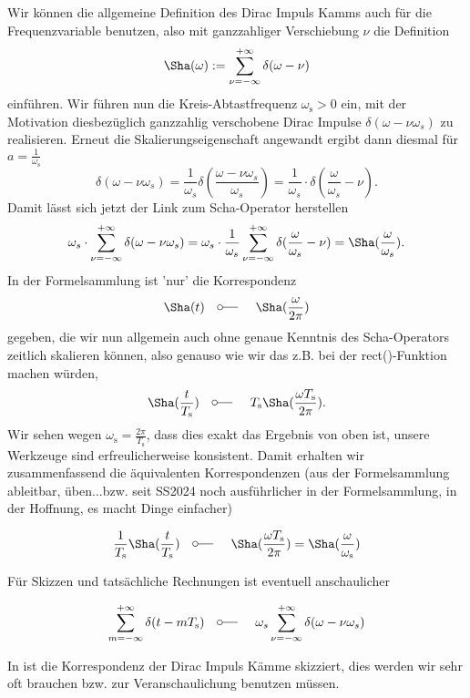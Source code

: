 Wir können die allgemeine Definition des Dirac Impuls Kamms
auch für die Frequenzvariable benutzen, also mit ganzzahliger Verschiebung $\nu$
die Definition
\begin{equation}
{\Sha}(\omega) := \sum_{\nu=-\infty}^{+\infty} \delta(\omega-\nu)
\end{equation}
einführen.
Wir führen nun die Kreis-Abtastfrequenz $\omega_\mathrm{s}>0$ ein, mit der Motivation
diesbezüglich ganzzahlig verschobene Dirac Impulse $\delta(\omega - \nu \omega_s)$
zu realisieren.
Erneut die Skalierungseigenschaft angewandt ergibt dann diesmal für
$a=\frac{1}{\omega_\mathrm{s}}$
\begin{equation}
\delta(\omega - \nu \omega_s) =
\frac{1}{\omega_s}\delta(\frac{\omega - \nu \omega_s}{\omega_s}) =
\frac{1}{\omega_s} \cdot \delta(\frac{\omega}{\omega_s}-\nu).
\end{equation}
%
Damit lässt sich jetzt der Link zum Scha-Operator herstellen
\begin{equation}
\omega_s \cdot \sum_{\nu=-\infty}^{+\infty} \delta(\omega-\nu \omega_s) =
\omega_s \cdot \frac{1}{\omega_s} \sum_{\nu=-\infty}^{+\infty} \delta(\frac{\omega}{\omega_s}-\nu) =
{\Sha}(\frac{\omega}{\omega_s}).
\end{equation}
%
In der Formelsammlung ist 'nur' die Korrespondenz
\begin{align}
  \Sha(t) \quad\fourier\quad \Sha(\frac{\omega}{2\pi})
\end{align}
gegeben, die wir nun allgemein auch ohne genaue Kenntnis des Scha-Operators zeitlich
skalieren können, also genauso wie wir das z.B. bei der rect()-Funktion machen würden,
\begin{align}
  \Sha(\frac{t}{T_\mathrm{s}}) \quad\fourier\quad
  T_\mathrm{s} \Sha(\frac{\omega T_\mathrm{s}}{2\pi}).
\end{align}
Wir sehen wegen $\omega_\mathrm{s} = \frac{2 \pi}{T_\mathrm{s}} $,
dass dies exakt das Ergebnis von oben ist, unsere Werkzeuge
sind erfreulicherweise konsistent.
%
Damit erhalten wir zusammenfassend die äquivalenten Korrespondenzen
(aus der Formelsammlung ableitbar, üben...bzw. seit SS2024 noch ausführlicher in der Formelsammlung, in der Hoffnung, es macht Dinge einfacher)
\begin{mdframed}
\begin{equation}
\frac{1}{T_\mathrm{s}} {\Sha}(\frac{t}{T_\mathrm{s}}) \quad\fourier\quad
{\Sha}(\frac{\omega T_\mathrm{s}}{2 \pi}) =
\Sha(\frac{\omega}{\omega_\mathrm{s}})
\end{equation}
\end{mdframed}
Für Skizzen und tatsächliche Rechnungen ist eventuell anschaulicher
\begin{mdframed}
\begin{equation}
\sum_{m=-\infty}^{+\infty} \delta(t-m T_\mathrm{s}) \quad\fourier\quad
\omega_s \sum_{\nu=-\infty}^{+\infty} \delta(\omega-\nu \omega_s)
\end{equation}
\end{mdframed}
%
In  ist die Korrespondenz der Dirac Impuls Kämme
skizziert, dies werden wir sehr oft brauchen bzw. zur Veranschaulichung benutzen
müssen.

